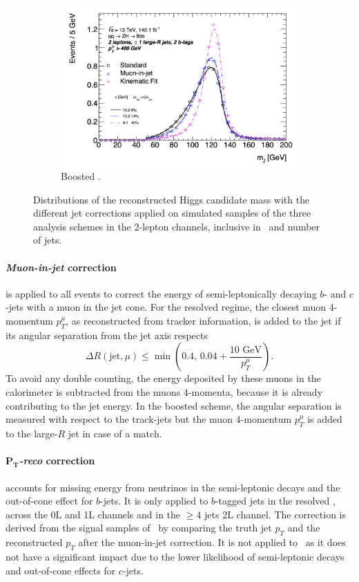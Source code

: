 \begin{figure}[h!]
\begin{subfigure}[b]{0.49\textwidth}
    \includegraphics[width=\textwidth]{Images/VH/Correct/CorrectedDist/bbB.png}
    \caption{Boosted \vhb.}
  \end{subfigure}
  \caption{Distributions of the reconstructed Higgs candidate mass with the different jet corrections applied on simulated samples of the three analysis schemes in the 2-lepton channels, inclusive in \ptv\ and number of jets.}
  \label{fig:CorrResults}
\end{figure} 

\paragraph{\textit{Muon-in-jet} correction} is applied to all events to correct the energy of semi-leptonically decaying $b$- and $c$-jets with a muon in the jet cone. For the resolved regime, the closest muon 4-momentum $p_T^{\mu}$, as reconstructed from tracker information, is added to the jet if its angular separation from the jet axis respects \[\Delta R(\textrm{jet}, \mu) \leq \min\left(0.4, \,0.04 + \frac{10 \textrm{ GeV}}{p_T^{\mu}}\right).\] To avoid any double counting, the energy deposited by these muons in the calorimeter is subtracted from the muons 4-momenta, because it is already contributing to the jet energy. In the boosted scheme, the angular separation is measured with respect to the track-jets but the muon 4-momentum $p_T^{\mu}$ is added to the large-$R$ jet in case of a match.

\paragraph{\textit{$\boldsymbol{P_T}$-reco} correction} accounts for missing energy from neutrinos in the semi-leptonic decays and the out-of-cone effect for $b$-jets. It is only applied to $b$-tagged jets in the resolved \vhb, across the 0L and 1L channels and in the $\geq4$ jets 2L channel. The correction is derived from the signal samples of \vhb\ by comparing the truth jet $p_T$ and the reconstructed $p_T$ after the muon-in-jet correction. It is not applied to \vhc\ as it does not have a significant impact due to the lower likelihood of semi-leptonic decays and out-of-cone effects for $c$-jets.

